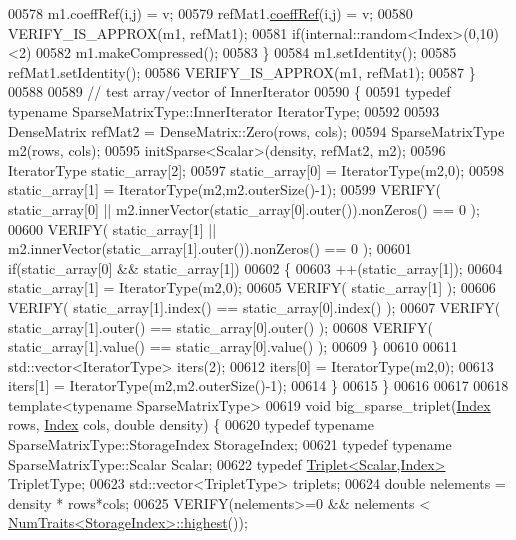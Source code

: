 \begin{DoxyCode}
00578       m1.coeffRef(i,j) = v;
00579       refMat1.\hyperlink{class_eigen_1_1_plain_object_base_a25626a55b26a4323565f79d1b7c48ea8}{coeffRef}(i,j) = v;
00580       VERIFY\_IS\_APPROX(m1, refMat1);
00581       \textcolor{keywordflow}{if}(internal::random<Index>(0,10)<2)
00582         m1.makeCompressed();
00583     \}
00584     m1.setIdentity();
00585     refMat1.setIdentity();
00586     VERIFY\_IS\_APPROX(m1, refMat1);
00587   \}
00588 
00589   \textcolor{comment}{// test array/vector of InnerIterator}
00590   \{
00591     \textcolor{keyword}{typedef} \textcolor{keyword}{typename} SparseMatrixType::InnerIterator IteratorType;
00592 
00593     DenseMatrix refMat2 = DenseMatrix::Zero(rows, cols);
00594     SparseMatrixType m2(rows, cols);
00595     initSparse<Scalar>(density, refMat2, m2);
00596     IteratorType static\_array[2];
00597     static\_array[0] = IteratorType(m2,0);
00598     static\_array[1] = IteratorType(m2,m2.outerSize()-1);
00599     VERIFY( static\_array[0] || m2.innerVector(static\_array[0].outer()).nonZeros() == 0 );
00600     VERIFY( static\_array[1] || m2.innerVector(static\_array[1].outer()).nonZeros() == 0 );
00601     \textcolor{keywordflow}{if}(static\_array[0] && static\_array[1])
00602     \{
00603       ++(static\_array[1]);
00604       static\_array[1] = IteratorType(m2,0);
00605       VERIFY( static\_array[1] );
00606       VERIFY( static\_array[1].index() == static\_array[0].index() );
00607       VERIFY( static\_array[1].outer() == static\_array[0].outer() );
00608       VERIFY( static\_array[1].value() == static\_array[0].value() );
00609     \}
00610 
00611     std::vector<IteratorType> iters(2);
00612     iters[0] = IteratorType(m2,0);
00613     iters[1] = IteratorType(m2,m2.outerSize()-1);
00614   \}
00615 \}
00616 
00617 
00618 \textcolor{keyword}{template}<\textcolor{keyword}{typename} SparseMatrixType>
00619 \textcolor{keywordtype}{void} big\_sparse\_triplet(\hyperlink{namespace_eigen_a62e77e0933482dafde8fe197d9a2cfde}{Index} rows, \hyperlink{namespace_eigen_a62e77e0933482dafde8fe197d9a2cfde}{Index} cols, \textcolor{keywordtype}{double} density) \{
00620   \textcolor{keyword}{typedef} \textcolor{keyword}{typename} SparseMatrixType::StorageIndex StorageIndex;
00621   \textcolor{keyword}{typedef} \textcolor{keyword}{typename} SparseMatrixType::Scalar Scalar;
00622   \textcolor{keyword}{typedef} \hyperlink{group___sparse_core___module_class_eigen_1_1_triplet}{Triplet<Scalar,Index>} TripletType;
00623   std::vector<TripletType> triplets;
00624   \textcolor{keywordtype}{double} nelements = density * rows*cols;
00625   VERIFY(nelements>=0 && nelements <  \hyperlink{group___core___module_struct_eigen_1_1_num_traits}{NumTraits<StorageIndex>::highest}());

\end{DoxyCode}
